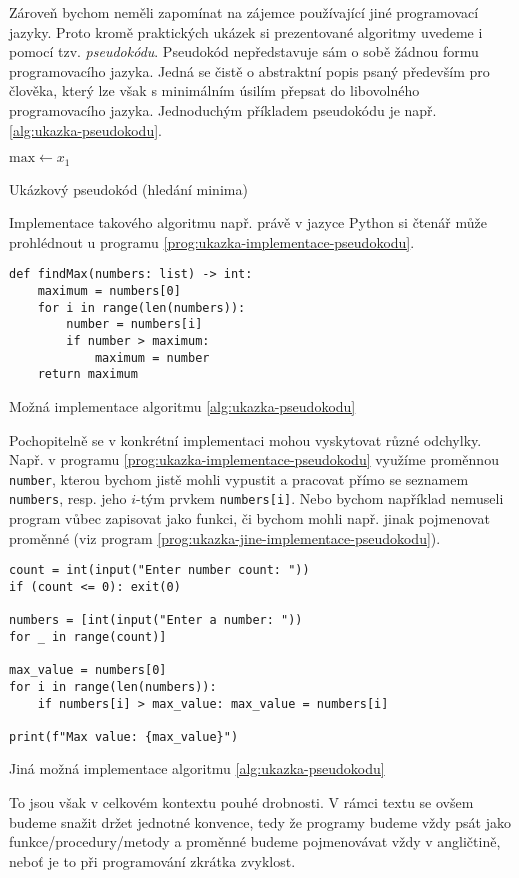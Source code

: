 Zároveň bychom neměli zapomínat na zájemce používající jiné programovací jazyky. Proto kromě praktických ukázek si prezentované algoritmy uvedeme i pomocí tzv. \emph{pseudokódu}. Pseudokód nepředstavuje sám o sobě žádnou formu programovacího jazyka. Jedná se čistě o abstraktní popis psaný především pro člověka, který lze však s minimálním úsilím přepsat do libovolného programovacího jazyka. Jednoduchým příkladem pseudokódu je např. \ref{alg:ukazka-pseudokodu}.
\begin{algorithm}
    $\text{max}\gets x_1$\\
    \caption{Ukázkový pseudokód (hledání minima)}
    \label{alg:ukazka-pseudokodu}
\end{algorithm}
Implementace takového algoritmu např. právě v jazyce Python si čtenář může prohlédnout u programu \ref{prog:ukazka-implementace-pseudokodu}.
\begin{program}[h]
\begin{lstlisting}[style=python]
def findMax(numbers: list) -> int:
    maximum = numbers[0]
    for i in range(len(numbers)):
        number = numbers[i]
        if number > maximum:
            maximum = number
    return maximum
\end{lstlisting}
    \caption{Možná implementace algoritmu \ref{alg:ukazka-pseudokodu}}
    \label{prog:ukazka-implementace-pseudokodu}
\end{program}
Pochopitelně se v konkrétní implementaci mohou vyskytovat různé odchylky. Např. v programu \ref{prog:ukazka-implementace-pseudokodu} využíme proměnnou \texttt{number}, kterou bychom jistě mohli vypustit a pracovat přímo se seznamem \texttt{numbers}, resp. jeho $i$-tým prvkem \texttt{numbers[i]}. Nebo bychom například nemuseli program vůbec zapisovat jako funkci, či bychom mohli např. jinak pojmenovat proměnné (viz program \ref{prog:ukazka-jine-implementace-pseudokodu}).
\begin{program}[h]
\begin{lstlisting}[style=python]
count = int(input("Enter number count: "))
if (count <= 0): exit(0)

numbers = [int(input("Enter a number: "))
for _ in range(count)]

max_value = numbers[0]
for i in range(len(numbers)):
    if numbers[i] > max_value: max_value = numbers[i]

print(f"Max value: {max_value}")
\end{lstlisting}
    \caption{Jiná možná implementace algoritmu \ref{alg:ukazka-pseudokodu}}
    \label{prog:ukazka-jine-implementace-pseudokodu}
    \end{program}
To jsou však v celkovém kontextu pouhé drobnosti. V rámci textu se ovšem budeme snažit držet jednotné konvence, tedy že programy budeme vždy psát jako funkce/procedury/metody a proměnné budeme pojmenovávat vždy v angličtině, neboť je to při programování zkrátka zvyklost.
